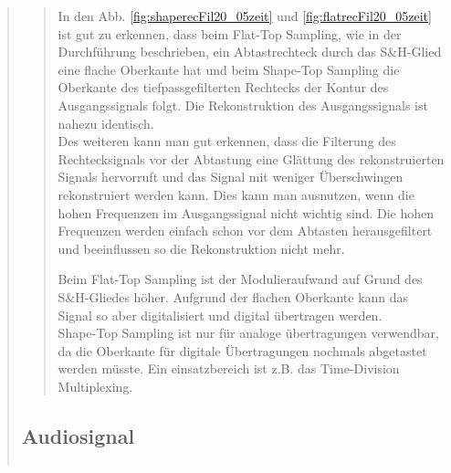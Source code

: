 \begin{quote}
\begin{quote}
            In den Abb. \ref{fig:shaperecFil20_05zeit} und \ref{fig:flatrecFil20_05zeit} ist gut zu erkennen, dass beim
            Flat-Top Sampling, wie in der Durchführung beschrieben, ein Abtastrechteck durch das S\&H-Glied eine flache
            Oberkante hat und beim Shape-Top Sampling die Oberkante des tiefpassgefilterten Rechtecks der Kontur des
            Ausgangssignals folgt.
            Die Rekonstruktion des Ausgangssignals ist nahezu identisch.\\
            Des weiteren kann man gut erkennen, dass die Filterung des Rechtecksignals vor der Abtastung eine Glättung des
            rekonstruierten Signals hervorruft und das Signal mit weniger Überschwingen rekonstruiert werden kann. Dies kann
            man ausnutzen, wenn die hohen Frequenzen im Ausgangssignal nicht wichtig sind. Die hohen Frequenzen werden
            einfach schon vor dem Abtasten herausgefiltert und beeinflussen so die Rekonstruktion nicht mehr.
            
            Beim Flat-Top Sampling ist der Modulieraufwand auf Grund des S\&H-Gliedes höher. Aufgrund der flachen
            Oberkante kann das Signal so aber digitalisiert und digital übertragen werden.\\
            Shape-Top Sampling ist nur für analoge übertragungen verwendbar, da die Oberkante für digitale
            Übertragungen nochmals abgetastet werden müsste. Ein einsatzbereich ist z.B. das Time-Division Multiplexing.
            
      
      \end{quote}
      
      \subsection{Audiosignal}
      \begin{quote}
      
          \begin{center}
                \begin{tabular}{ll}
                

\end{tabular}
\end{center}
\end{quote}
\end{quote}
